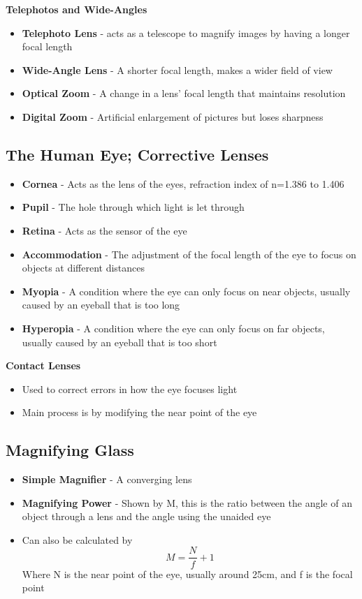 \textbf{Telephotos and Wide-Angles}
\begin{itemize}
    \item \textbf{Telephoto Lens} - acts as a telescope to magnify images by having a longer focal length
    \item \textbf{Wide-Angle Lens} - A shorter focal length, makes a wider field of view
    \item \textbf{Optical Zoom} - A change in a lens' focal length that maintains resolution
    \item \textbf{Digital Zoom} - Artificial enlargement of pictures but loses sharpness
\end{itemize}


\subsection{The Human Eye; Corrective Lenses}
\begin{itemize}
    \item \textbf{Cornea} - Acts as the lens of the eyes, refraction index of n=1.386 to 1.406
    \item \textbf{Pupil} - The hole through which light is let through
    \item \textbf{Retina} - Acts as the sensor of the eye
    \item \textbf{Accommodation} - The adjustment of the focal length of the eye to focus on objects at different distances
    \item \textbf{Myopia} - A condition where the eye can only focus on near objects, usually caused by an eyeball that is too long
    \item \textbf{Hyperopia} - A condition where the eye can only focus on far objects, usually caused by an eyeball that is too short
\end{itemize}

\textbf{Contact Lenses}
\begin{itemize}
    \item Used to correct errors in how the eye focuses light
    \item Main process is by modifying the near point of the eye
\end{itemize}

\subsection{Magnifying Glass}
\begin{itemize}
    \item \textbf{Simple Magnifier} - A converging lens
    \item \textbf{Magnifying Power} - Shown by M, this is the ratio between the angle of an object through a lens and the angle using the unaided eye
    \item Can also be calculated by \[M=\frac{N}{f}+1\] Where N is the near point of the eye, usually around 25cm, and f is the focal point
\end{itemize}

